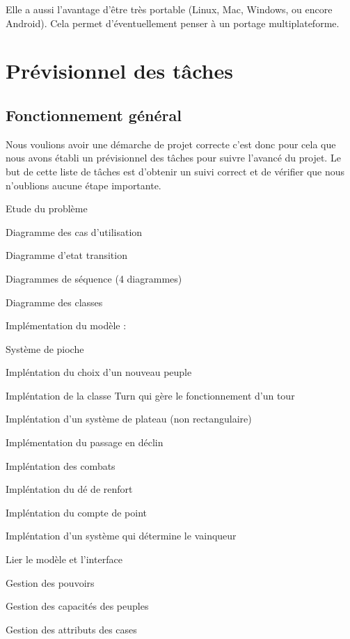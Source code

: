 \documentclass[11pt]{report}
\begin{document}
		Elle a aussi l'avantage d'être très portable (Linux, Mac, Windows, ou encore Android). Cela permet d'éventuellement penser à un portage multiplateforme.
\chapter{Prévisionnel des tâches}

	\section{Fonctionnement général}	
	
	Nous voulions avoir une démarche de projet correcte c'est donc pour cela que nous avons établi un prévisionnel des tâches pour suivre l'avancé du projet.
Le but de cette liste de tâches est d'obtenir un suivi correct et de vérifier que nous n'oublions aucune étape importante.
	\begin{description}
	\item Etude du problème
    \item Diagramme des cas d'utilisation
	\item Diagramme d'etat transition
	\item Diagrammes de séquence (4 diagrammes)
	\item Diagramme des classes
	\item Implémentation du modèle : 
	\item Système de pioche
	\item Impléntation du choix d'un nouveau peuple
	\item Impléntation de la classe Turn qui gère le fonctionnement d'un tour
	\item Impléntation d'un système de plateau (non rectangulaire)
	\item Implémentation du passage en déclin
	\item Impléntation des combats
	\item Impléntation du dé de renfort
	\item Impléntation du compte de point
	\item Impléntation d'un système qui détermine le vainqueur
	\item Lier le modèle et l'interface
	\item Gestion des pouvoirs
	\item Gestion des capacités des peuples
	\item Gestion des attributs des cases
	\end{description}
\end{document}

